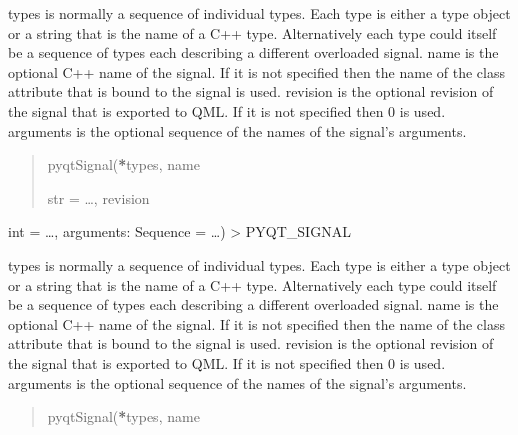 \documentclass[letterpaper,10pt,english]{sphinxmanual}
\begin{document}
\begin{fulllineitems}
\begin{fulllineitems}
\sphinxAtStartPar
types is normally a sequence of individual types.  Each type is either a
type object or a string that is the name of a C++ type.  Alternatively
each type could itself be a sequence of types each describing a different
overloaded signal.
name is the optional C++ name of the signal.  If it is not specified then
the name of the class attribute that is bound to the signal is used.
revision is the optional revision of the signal that is exported to QML.
If it is not specified then 0 is used.
arguments is the optional sequence of the names of the signal’s arguments.
\begin{quote}\begin{description}
\sphinxAtStartPar
pyqtSignal({\color{red}\bfseries{}*}types, name

\sphinxAtStartPar
str = …, revision

\end{description}\end{quote}

\end{fulllineitems}


\begin{fulllineitems}
\label{\detokenize{source/GUIWidgets:GUIWidgets.PointSourceInitializationWidget.sendCoordinates}}
\pysigstartsignatures
\pysigline
{}
\pysigstopsignatures
\sphinxAtStartPar
int = …, arguments: Sequence = …) \sphinxhyphen{}\textgreater{} PYQT\_SIGNAL

\sphinxAtStartPar
types is normally a sequence of individual types.  Each type is either a
type object or a string that is the name of a C++ type.  Alternatively
each type could itself be a sequence of types each describing a different
overloaded signal.
name is the optional C++ name of the signal.  If it is not specified then
the name of the class attribute that is bound to the signal is used.
revision is the optional revision of the signal that is exported to QML.
If it is not specified then 0 is used.
arguments is the optional sequence of the names of the signal’s arguments.
\begin{quote}\begin{description}
\sphinxAtStartPar
pyqtSignal({\color{red}\bfseries{}*}types, name


\end{description}
\end{quote}
\end{fulllineitems}
\end{fulllineitems}
\end{document}

